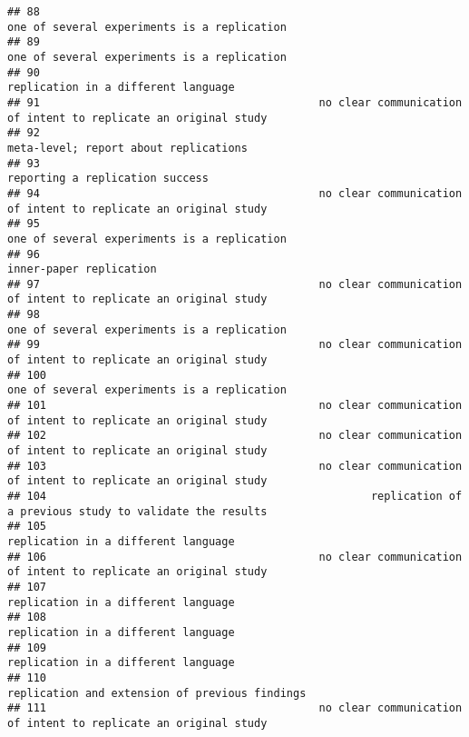 \documentclass[
  english,
  man]{apa6}
\begin{document}
\begin{verbatim}
## 88                                                               one of several experiments is a replication
## 89                                                               one of several experiments is a replication
## 90                                                                       replication in a different language
## 91                                           no clear communication of intent to replicate an original study
## 92                                                                     meta-level; report about replications
## 93                                                                           reporting a replication success
## 94                                           no clear communication of intent to replicate an original study
## 95                                                               one of several experiments is a replication
## 96                                                                                   inner-paper replication
## 97                                           no clear communication of intent to replicate an original study
## 98                                                               one of several experiments is a replication
## 99                                           no clear communication of intent to replicate an original study
## 100                                                              one of several experiments is a replication
## 101                                          no clear communication of intent to replicate an original study
## 102                                          no clear communication of intent to replicate an original study
## 103                                          no clear communication of intent to replicate an original study
## 104                                                  replication of a previous study to validate the results
## 105                                                                      replication in a different language
## 106                                          no clear communication of intent to replicate an original study
## 107                                                                      replication in a different language
## 108                                                                      replication in a different language
## 109                                                                      replication in a different language
## 110                                                           replication and extension of previous findings
## 111                                          no clear communication of intent to replicate an original study

\end{verbatim}
\end{document}

